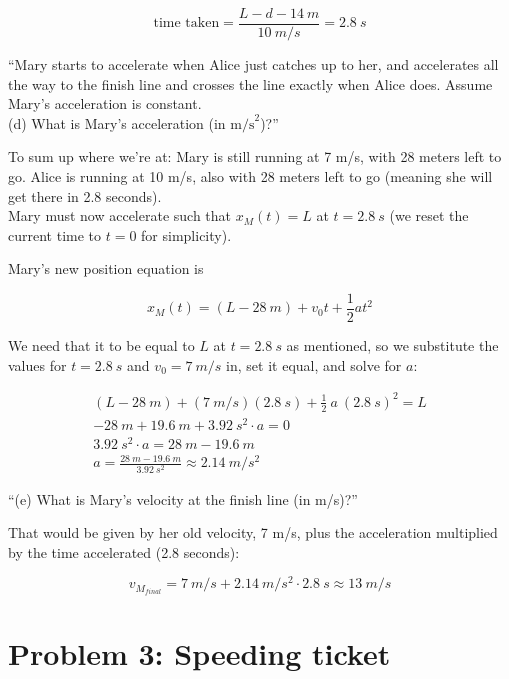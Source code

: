 \documentclass[12pt,a4paper]{report}
\begin{document}
\begin{equation}
\text{time taken} = \frac{L - d - \SI{14}{m}}{\SI{10}{m/s}} = \SI{2.8}{s}
\end{equation}

``Mary starts to accelerate when Alice just catches up to her, and accelerates all the way to the finish line and crosses the line exactly when Alice does. Assume Mary's acceleration is constant.\\
(d) What is Mary's acceleration (in $\text{m/s}^2$)?''

To sum up where we're at: Mary is still running at 7 m/s, with 28 meters left to go. Alice is running at 10 m/s, also with 28 meters left to go (meaning she will get there in 2.8 seconds).\\
Mary must now accelerate such that $x_M(t) = L$ at $t = \SI{2.8}{s}$ (we reset the current time to $t=0$ for simplicity).

Mary's new position equation is

\begin{equation}
x_M(t) = (L - \SI{28}{m}) + v_0 t + \frac{1}{2} a t^2
\end{equation}

We need that it to be equal to $L$ at $t = \SI{2.8}{s}$ as mentioned, so we substitute the values for $t = \SI{2.8}{s}$ and $v_0 = \SI{7}{m/s}$ in, set it equal, and solve for $a$:

\begin{align}
(L - \SI{28}{m}) + (\SI{7}{m/s})(\SI{2.8}{s}) + \frac{1}{2}\ a\ (\SI{2.8}{s})^2 = L\\
- \SI{28}{m} + \SI{19.6}{m} + \SI{3.92}{s^2} \cdot a = 0\\
\SI{3.92}{s^2} \cdot a = \SI{28}{m} - \SI{19.6}{m}\\
a = \frac{\SI{28}{m} - \SI{19.6}{m}}{\SI{3.92}{s^2}} \approx \SI{2.14}{m/s^2}
\end{align}

``(e) What is Mary's velocity at the finish line (in m/s)?''

That would be given by her old velocity, 7 m/s, plus the acceleration multiplied by the time accelerated (2.8 seconds):

\begin{equation}
v_{M_{final}} = \SI{7}{m/s} + \SI{2.14}{m/s^2} \cdot \SI{2.8}{s} \approx \SI{13}{m/s}
\end{equation}

\section{Problem 3: Speeding ticket}
\end{document}
